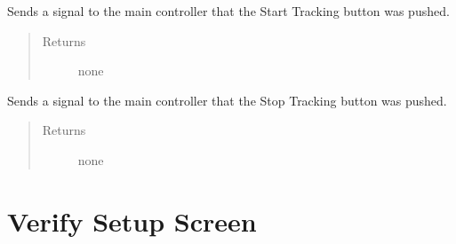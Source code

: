 \documentclass[letterpaper,10pt,english]{sphinxmanual}
\begin{document}
\begin{fulllineitems}
\begin{fulllineitems}
\begin{quote}
\begin{description}
\end{description}\end{quote}

\end{fulllineitems}


\begin{fulllineitems}
\label{\detokenize{index:src.Views.View_TrackingScreen.TrackingWindow.startTracking}}
Sends a signal to the main controller that the Start Tracking button was pushed.
\begin{quote}\begin{description}
\item[{Returns}] \leavevmode
none

\end{description}\end{quote}

\end{fulllineitems}


\begin{fulllineitems}
\label{\detokenize{index:src.Views.View_TrackingScreen.TrackingWindow.stopTracking}}
Sends a signal to the main controller that the Stop Tracking button was pushed.
\begin{quote}\begin{description}
\item[{Returns}] \leavevmode
none

\end{description}\end{quote}

\end{fulllineitems}


\end{fulllineitems}



\chapter{Verify Setup Screen}
\label{\detokenize{index:module-src.Views.View_VerifySetupScreen}}\label{\detokenize{index:verify-setup-screen}}
\end{document}

